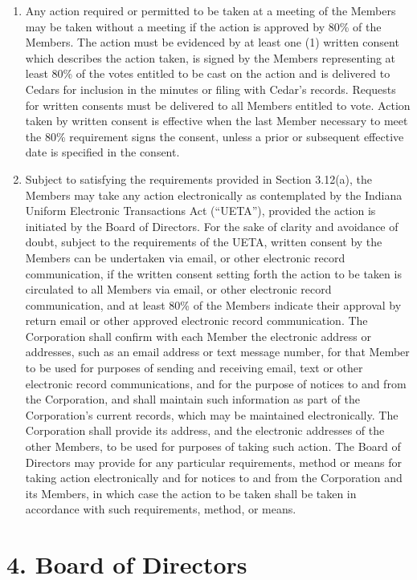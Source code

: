 \documentclass[
]{book}
\begin{document}
\begin{enumerate}
\def\labelenumi{\alph{enumi}.}
\item
  Any action required or permitted to be taken at a meeting of the Members may be taken without a meeting if the action is approved by 80\% of the Members. The action must be evidenced by at least one (1) written consent which describes the action taken, is signed by the Members representing at least 80\% of the votes entitled to be cast on the action and is delivered to Cedars for inclusion in the minutes or filing with Cedar's records. Requests for written consents must be delivered to all Members entitled to vote. Action taken by written consent is effective when the last Member necessary to meet the 80\% requirement signs the consent, unless a prior or subsequent effective date is specified in the consent.
\item
  Subject to satisfying the requirements provided in Section 3.12(a), the Members may take any action electronically as contemplated by the Indiana Uniform Electronic Transactions Act (``UETA''), provided the action is initiated by the Board of Directors. For the sake of clarity and avoidance of doubt, subject to the requirements of the UETA, written consent by the Members can be undertaken via email, or other electronic record communication, if the written consent setting forth the action to be taken is circulated to all Members via email, or other electronic record communication, and at least 80\% of the Members indicate their approval by return email or other approved electronic record communication. The Corporation shall confirm with each Member the electronic address or addresses, such as an email address or text message number, for that Member to be used for purposes of sending and receiving email, text or other electronic record communications, and for the purpose of notices to and from the Corporation, and shall maintain such information as part of the Corporation's current records, which may be maintained electronically. The Corporation shall provide its address, and the electronic addresses of the other Members, to be used for purposes of taking such action. The Board of Directors may provide for any particular requirements, method or means for taking action electronically and for notices to and from the Corporation and its Members, in which case the action to be taken shall be taken in accordance with such requirements, method, or means.
\end{enumerate}

\section*{4. Board of Directors}\label{board-of-directors}
\end{document}
